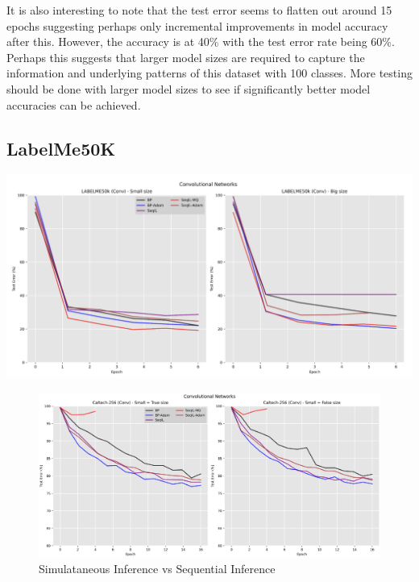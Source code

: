 \documentclass{article}
\theoremstyle{plain}
\theoremstyle{definition}
\theoremstyle{remark}
\begin{document}
It is also interesting to note that the test error seems to flatten out around 15 epochs suggesting 
perhaps only incremental improvements in model accuracy after this. However, the accuracy is at 40\% with 
the test error rate being 60\%. Perhaps this suggests that larger model sizes are required to capture 
the information and underlying patterns of this dataset with 100 classes. More testing should be done with larger 
model sizes to see if significantly better model accuracies can be achieved.

\subsection*{LabelMe50K}

\centerline{\includegraphics[width=\columnwidth]{images/LabelMe.png}}

\begin{figure}[ht]
    \begin{center}
        \centerline{\includegraphics[width=\paperwidth]{images/caltech-256_results.png}}
    \caption{Simulataneous Inference vs Sequential Inference}
    \end{center}
\end{figure}
\end{document}
